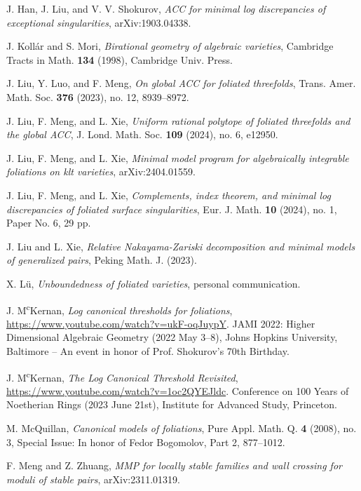 \documentclass[12pt]{amsart}
\numberwithin{equation}{section}
\theoremstyle{definition}
\theoremstyle{definition}
\theoremstyle{definition}
\begin{document}
\begin{thebibliography}{99}
 J. Han, J. Liu, and V. V. Shokurov, \textit{ACC for minimal log discrepancies of exceptional singularities}, arXiv:1903.04338.




 J. Koll\'{a}r and S. Mori, \textit{Birational geometry of algebraic varieties}, Cambridge Tracts in Math. \textbf{134} (1998), Cambridge Univ. Press.

 J. Liu, Y. Luo, and F. Meng, \textit{On global ACC for foliated threefolds},  Trans. Amer. Math. Soc. \textbf{376} (2023), no. 12, 8939--8972.

 J. Liu, F. Meng, and L. Xie, \textit{Uniform rational polytope of foliated threefolds and the global ACC}, J. Lond. Math. Soc. \textbf{109} (2024), no. 6, e12950.

 J. Liu, F. Meng, and L. Xie, \textit{Minimal model program for algebraically integrable foliations on klt varieties}, arXiv:2404.01559.

 J. Liu, F. Meng, and L. Xie, \textit{Complements, index theorem, and minimal log discrepancies of foliated surface singularities}, Eur. J. Math. \textbf{10} (2024), no. 1, Paper No. 6, 29 pp.

 J. Liu and L. Xie, \textit{Relative Nakayama-Zariski decomposition and minimal models of generalized pairs}, Peking Math. J. (2023).

 X. Lü, \textit{Unboundedness of foliated varieties}, personal communication.

 J. M\textsuperscript{c}Kernan, \textit{Log canonical thresholds for foliations}, \url{https://www.youtube.com/watch?v=ukF-oqJuypY}. JAMI 2022: Higher Dimensional Algebraic Geometry (2022 May 3--8), Johns Hopkins University, Baltimore -- An event in honor of Prof. Shokurov's 70th Birthday.

 J. M\textsuperscript{c}Kernan, \textit{The Log Canonical Threshold Revisited}, \url{https://www.youtube.com/watch?v=1oc2QYEJldc}. Conference on 100 Years of Noetherian Rings (2023 June 21st), Institute for Advanced Study, Princeton.


 M. McQuillan, \textit{Canonical models of foliations}, Pure Appl. Math. Q. \textbf{4} (2008), no. 3, Special Issue: In honor of Fedor Bogomolov, Part 2, 877--1012.

 F. Meng and Z. Zhuang, \textit{MMP for locally stable families and wall crossing for moduli of stable pairs}, arXiv:2311.01319.



\end{thebibliography}
\end{document}
